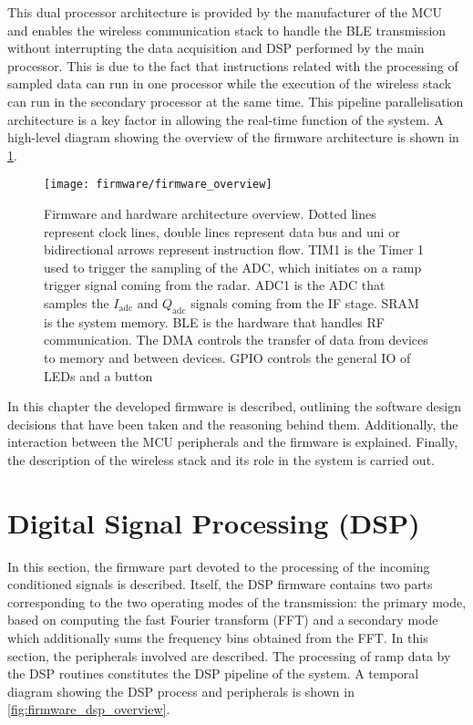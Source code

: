 This dual processor architecture is provided by the manufacturer of the MCU and enables the wireless communication stack to handle the BLE transmission without interrupting the data acquisition and DSP performed by the main processor. This is due to the fact that instructions related with the processing of sampled data can run in one processor while the execution of the wireless stack can run in the secondary processor at the same time. This pipeline parallelisation architecture is a key factor in allowing the real-time function of the system. A high-level diagram showing the overview of the firmware architecture is shown in \cref{fig:firmware_overview}.

\begin{figure}[ht]
	\centering
	\texttt{[image: firmware/firmware\_overview]}
	\caption{Firmware and hardware architecture overview. Dotted lines represent clock lines, double lines represent data bus and uni or bidirectional arrows represent instruction flow. TIM1 is the Timer 1 used to trigger the sampling of the ADC, which initiates on a ramp trigger signal coming from the radar. ADC1 is the ADC that samples the $I_{\mathrm{adc}}$ and $Q_{\mathrm{adc}}$ signals coming from the IF stage. SRAM is the system memory. BLE is the hardware that handles RF communication. The DMA controls the transfer of data from devices to memory and between devices. GPIO controls the general IO of LEDs and a button}
	\label{fig:firmware_overview}
\end{figure}

In this chapter the developed firmware is described, outlining the software design decisions that have been taken and the reasoning behind them. Additionally, the interaction between the MCU peripherals and the firmware is explained. Finally, the description of the wireless stack and its role in the system is carried out.

\section{Digital Signal Processing (DSP)}

In this section, the firmware part devoted to the processing of the incoming conditioned signals is described. Itself, the DSP firmware contains two parts corresponding to the two operating modes of the transmission: the primary mode, based on computing the fast Fourier transform (FFT) and a secondary mode which additionally sums the frequency bins obtained from the FFT. In this section, the peripherals involved are described. The processing of ramp data by the DSP routines constitutes the DSP pipeline of the system. A temporal diagram showing the DSP process and peripherals is shown in \cref{fig:firmware_dsp_overview}.


